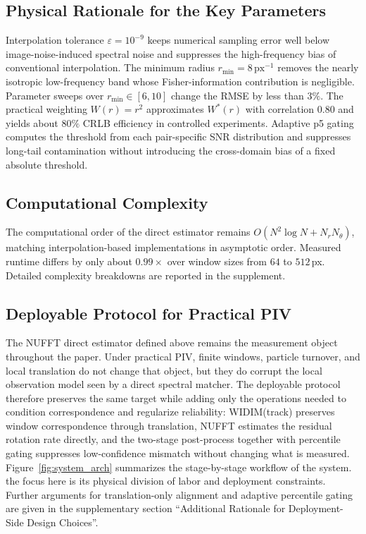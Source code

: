 \documentclass[lettersize,journal]{IEEEtran}
\begin{document}
\subsection{Physical Rationale for the Key Parameters}
\label{sec:params}

Interpolation tolerance $\varepsilon = 10^{-9}$ keeps numerical sampling error well below image-noise-induced spectral noise and suppresses the high-frequency bias of conventional interpolation. The minimum radius $r_{\min}=8\,\mathrm{px}^{-1}$ removes the nearly isotropic low-frequency band whose Fisher-information contribution is negligible. Parameter sweeps over $r_{\min}\in[6,10]$ change the RMSE by less than $3\%$. The practical weighting $W(r)=r^2$ approximates $W^*(r)$ with correlation $0.80$ and yields about $80\%$ CRLB efficiency in controlled experiments. Adaptive p5 gating computes the threshold from each pair-specific SNR distribution and suppresses long-tail contamination without introducing the cross-domain bias of a fixed absolute threshold.

\subsection{Computational Complexity}
\label{sec:complexity}
The computational order of the direct estimator remains $O(N^2\log N + N_rN_\theta)$, matching interpolation-based implementations in asymptotic order. Measured runtime differs by only about $0.99\times$ over window sizes from $64$ to $512\,$px. Detailed complexity breakdowns are reported in the supplement.

\subsection{Deployable Protocol for Practical PIV}
\label{sec:system}

The NUFFT direct estimator defined above remains the measurement object throughout the paper.
Under practical PIV, finite windows, particle turnover, and local translation do not change that object, but they do corrupt the local observation model seen by a direct spectral matcher.
The deployable protocol therefore preserves the same target while adding only the operations needed to condition correspondence and regularize reliability:
WIDIM(track) preserves window correspondence through translation,
NUFFT estimates the residual rotation rate directly,
and the two-stage post-process together with percentile gating suppresses low-confidence mismatch without changing what is measured.
Figure~\ref{fig:system_arch} summarizes the stage-by-stage workflow of the system.
the focus here is its physical division of labor and deployment constraints.
Further arguments for translation-only alignment and adaptive percentile gating are given in the supplementary section
``Additional Rationale for Deployment-Side Design Choices''.
\end{document}
